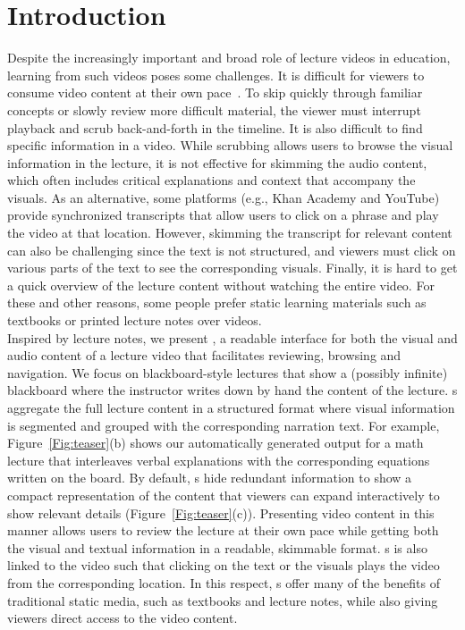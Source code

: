 
\section{Introduction}
Despite the increasingly important and broad role of lecture videos in education, learning from such videos poses some challenges. 
%
It is difficult for viewers to consume video content at their own pace~\cite{chi2012mixt}.
%
To skip quickly through familiar concepts or slowly review more difficult material, the viewer must interrupt playback and scrub back-and-forth in the timeline.
%
It is also difficult to find specific information in a video. While scrubbing allows users to browse the visual information in the lecture, it is not effective for skimming the audio content, which often includes critical explanations and context that accompany the visuals. As an alternative, some platforms (e.g., Khan Academy and YouTube) provide synchronized transcripts that allow users to click on a phrase and play the video at that location. However, skimming the transcript for relevant content can also be challenging since the text is not structured, and viewers must click on various parts of the text to see the corresponding visuals. 
%
Finally, it is hard to get a quick overview of the lecture content without watching the entire video. 
For these and other reasons, some people prefer static learning materials such as textbooks or printed lecture notes over videos.\\

Inspired by lecture notes, we present \systemname, a readable interface for both the visual and audio content of a lecture video that facilitates reviewing, browsing and navigation. 
%
We focus on blackboard-style lectures that show a (possibly infinite) blackboard where the instructor writes down by hand the content of the lecture. \systemname s aggregate the full lecture content in a structured format where visual information is segmented and grouped with the corresponding narration text. For example, Figure~\ref{Fig:teaser}(b) shows our automatically generated output for a math lecture that interleaves verbal explanations with the corresponding equations written on the board. 
%
By default, \systemname s hide redundant information to show a compact representation of the content that viewers can expand interactively to show relevant details (Figure~\ref{Fig:teaser}(c)). 
%
Presenting video content in this manner allows users to review the lecture at their own pace while getting both the visual and textual information in a readable, skimmable format.
%
\systemname s is also linked to the video such that clicking on the text or the visuals plays the video from the corresponding location.
%
In this respect, \systemname s offer many of the benefits of traditional static media, such as textbooks and lecture notes, while also giving viewers direct access to the video content.\\


